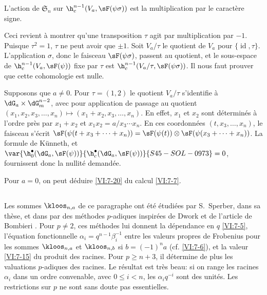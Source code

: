 \begin{proposition_}\label{VI:7-20}
L'action de $\mathfrak{S}_n$ sur $\h_c^{n-1}(V_a,\sF(\psi\sigma))$ est la multiplication 
par le caractère signe. 
\end{proposition_}

Ceci revient à montrer qu'une transposition $\tau$ agit par multiplication 
par $-1$. Puisque $\tau^2=1$, $\tau$ ne peut avoir  que 
$\pm 1$. Soit $V_a/\tau$ le quotient de $V_a$ pour 
$\{\operatorname{id},\tau\}$. L'application $\sigma$, donc le faisceau 
$\sF(\psi\sigma)$, passent au quotient, et le sous-espace de 
$\h_c^{n-1}(V_a,\sF(\psi))$ fixe par 
$\tau$ est $\h_c^{n-1}(V_a/\tau,\sF(\psi\sigma))$. Il nous faut prouver que 
cette cohomologie est nulle. 

Supposons que $a\ne 0$. Pour $\tau=(1,2)$ le quotient $V_a/\tau$ s'identifie 
à $\dG_a\times \dG_m^{n-2}$, avec pour application de passage au quotient 
$(x_1,x_2,x_3,\dots,x_n)\mapsto (x_1+x_2,x_3,\dots,x_n)$. En effet, $x_1$ et 
$x_2$ sont déterminés 
à l'ordre près par $x_1+x_2$ et 
$x_1x_2 = a/x_3\dotsm x_n$. En ces coordonnées $(t,x_3,\dots,x_n)$, le 
faisceau s'écrit 
$\sF(\psi(t+x_3+\cdots + x_n)) = \sF(\psi(t))\otimes \sF(\psi(x_3+\cdots + x_n))$. 
La formule de K\"unneth, et $\var{\h_0^\bullet(\dG_a,\sF(\psi))}{\h_c^\bullet(\dG_a,\sF(\psi))}{S45-SOL-0973} = 0$, fournissent 
donc la nullité demandée. 

Pour $a=0$, on peut déduire \ref{VI:7-20} du calcul \ref{VI:7-7}. 





\subsection{}\label{VI:7-21}

Les sommes $\kloos_{n,a}$ de ce paragraphe ont été étudiées par 
S.\ Sperber, dans sa thèse, et dans  par des méthodes 
$p$-adiques inspirées de Dwork et de l'article de Bombieri . 
Pour $p\ne 2$, ces méthodes lui donnent la dépendance en $q$ \ref{VI:7-5}, 
l'équation fonctionnelle $\alpha_i = q^{n-1} \beta_i^{-1}$ entre les 
valeurs propres de Frobenius pour les sommes $\kloos_{n,a}$ et 
$\kloos_{n,b}$ si $b=(-1)^n a$ (cf. \ref{VI:7-6}), et la valeur \ref{VI:7-15} 
du produit des racines. Pour $p\geqslant n+3$, il détermine de plus les 
valuations $p$-adiques des racines. Le résultat est très beau: si on range 
les racines $\alpha_i$ dans un ordre convenable, avec 
$0\leqslant i<n$, les $\alpha_i q^{-i}$ sont des unités. Les 
restrictions sur $p$ ne sont sans doute pas essentielles. 










